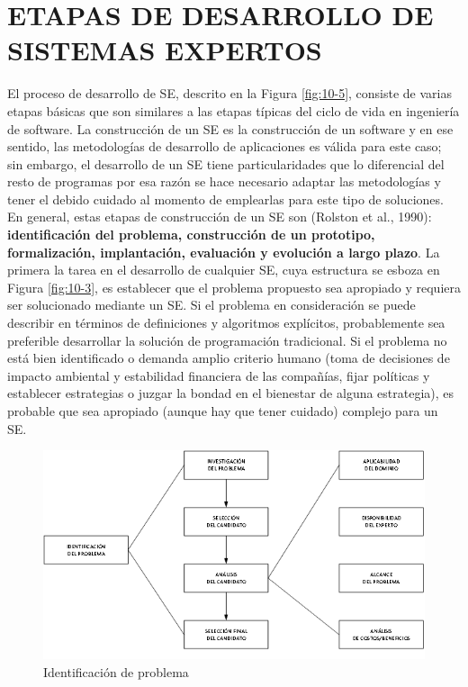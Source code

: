 \section{ETAPAS DE DESARROLLO DE SISTEMAS EXPERTOS}
El proceso de desarrollo de SE, descrito en la Figura \ref{fig:10-5}, consiste de varias etapas básicas que son similares a las etapas típicas del ciclo de vida en ingeniería de software. La construcción de un SE es la construcción de un software y en ese sentido, las metodologías de desarrollo de aplicaciones es válida para este caso; sin embargo, el desarrollo de un SE tiene particularidades que lo diferencial del resto de programas por esa razón se hace necesario adaptar las metodologías y tener el debido cuidado al momento de emplearlas para este tipo de soluciones.\\
En general, estas etapas de construcción de un SE son (Rolston et al., 1990): \textbf{identificación del problema, construcción de un prototipo, formalización, implantación, evaluación y evolución a largo plazo}. La primera la  tarea en el desarrollo de cualquier SE, cuya estructura se esboza en Figura \ref{fig:10-3}, es establecer que el problema propuesto sea apropiado y requiera ser solucionado mediante un SE. Si el problema en consideración se puede describir en términos de definiciones y algoritmos explícitos, probablemente sea preferible desarrollar la solución de programación tradicional. Si el problema no está bien identificado o demanda amplio criterio humano (toma de decisiones de impacto ambiental y estabilidad financiera de las compañías, fijar políticas y establecer estrategias o juzgar la bondad en el bienestar de alguna estrategia), es probable que sea apropiado (aunque hay que tener cuidado) complejo para un SE.
\begin{figure}[H]
\centering
\captionsetup{justification=centering,margin=2cm}
\includegraphics[scale=0.8]{chapters/chapter10/figures/10-6}
\caption{Identificación de problema}
\label{fig:10-6}
\end{figure}
